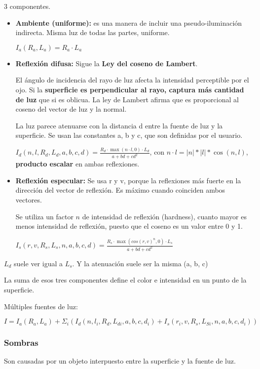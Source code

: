 3 componentes. 
    \begin{itemize}
        \item \textbf{Ambiente (uniforme):} es una manera de incluir una pseudo-iluminación indirecta. Misma luz de todas las partes, uniforme. 
        
        $I_a(R_a, L_a)=R_a \cdot L_a$
        \item \textbf{Reflexión difusa:} Sigue la \textbf{Ley del coseno de Lambert}. 
        
        El ángulo de incidencia del rayo de luz afecta la intensidad perceptible por el ojo. Si la \textbf{superficie es perpendicular al rayo, captura más cantidad de luz} que si es oblicua. La ley de Lambert afirma que es proporcional al coseno del vector de luz y la normal. 
        
        La luz parece atenuarse con la distancia d entre la fuente de luz y la superficie. Se usan las constantes a, b y c, que son definidas por el usuario.
        
        $I_d(n, l, R_d, L_d, a, b, c, d)= \frac {R_d \cdot \max (n\cdot l,0) \cdot L_d}{a+bd+cd^2}$, con $n \cdot l = |n|*|l|*\cos(n,l)$, \textbf{producto escalar} en ambas reflexiones.
        \item \textbf{Reflexión especular:} Se usa r y v, porque la reflexiones más fuerte en la dirección del vector de reflexión. Es máximo cuando coinciden ambos vectores.
        
        Se utiliza un factor $n$ de intensidad de reflexión (hardness), cuanto mayor es menos intensidad de reflexión, puesto que el coseno es un valor entre 0 y 1.
        
        $I_s(r,v, R_s, L_s, n, a, b, c, d)= \frac {R_s \cdot \max (cos(r,v)^n,0) \cdot L_s}{a+bd+cd^2}$
    \end{itemize}

$L_d$ suele ver igual a $L_s$. Y la atenuación suele ser la misma (a, b, c)

La suma de esos tres componentes define el color e intensidad en un punto de la superficie.

Múltiples fuentes de luz: 

$$I=I_a(R_a,L_a)+\Sigma_i (I_d(n, l_i, R_d, L_{di}, a, b, c, d_i)+I_s(r_i,v, R_s, L_{Si}, n, a, b, c, d_i))$$
\pagebreak

\subsubsection{Sombras} 
Son causadas por un objeto interpuesto entre la superficie y la fuente de luz.

